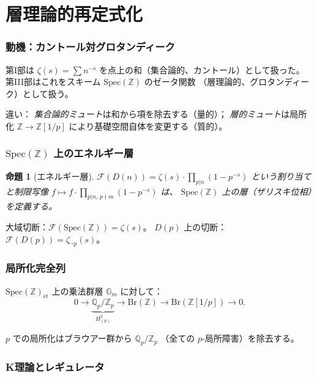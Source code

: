 \documentclass[11pt,a4paper]{article}
\newtheorem{proposition}[theorem]{命題}
\newcommand{\Spec}{\mathrm{Spec}}
\newcommand{\Br}{\mathrm{Br}}
\newcommand{\Zp}{\mathbb{Z}[1/p]}
\newcommand{\Qp}{\mathbb{Q}_p}
\newcommand{\Gm}{\mathbb{G}_m}
\begin{document}
\newpage
\part{層理論的再定式化}
\label{part:sheaf}

\section{動機：カントール対グロタンディーク}

第I部は $\zeta(s) = \sum n^{-s}$ を点上の和（集合論的、カントール）として扱った。
第III部はこれをスキーム $\Spec(\mathbb{Z})$ のゼータ関数
（層理論的、グロタンディーク）として扱う。

違い：
\emph{集合論的ミュート}は和から項を除去する（量的）；
\emph{層的ミュート}は局所化 $\mathbb{Z} \to \Zp$
により基礎空間自体を変更する（質的）。

\section{$\Spec(\mathbb{Z})$ 上のエネルギー層}

\begin{proposition}[エネルギー層]
$\mathcal{F}(D(n)) = \zeta(s)\cdot\prod_{p|n}(1-p^{-s})$
という割り当てと制限写像
$f \mapsto f\cdot\prod_{p|n,\,p\nmid m}(1-p^{-s})$ は、
$\Spec(\mathbb{Z})$ 上の層（ザリスキ位相）を定義する。
\end{proposition}

大域切断：$\mathcal{F}(\Spec(\mathbb{Z})) = \zeta(s)$。
$D(p)$ 上の切断：$\mathcal{F}(D(p)) = \zeta_{\neg p}(s)$。

\section{局所化完全列}

$\Spec(\mathbb{Z})_{\mathrm{\acute{e}t}}$
上の乗法群層 $\Gm$ に対して：
\begin{equation}
  0 \to \underbrace{\Qp/\mathbb{Z}_p}_{H^2_{(p)}} \to \Br(\mathbb{Z})
  \to \Br(\Zp) \to 0.
\end{equation}

$p$ での局所化はブラウアー群から $\Qp/\mathbb{Z}_p$
（全ての $p$-局所障害）を除去する。

\section{K理論とレギュレータ}
\end{document}
